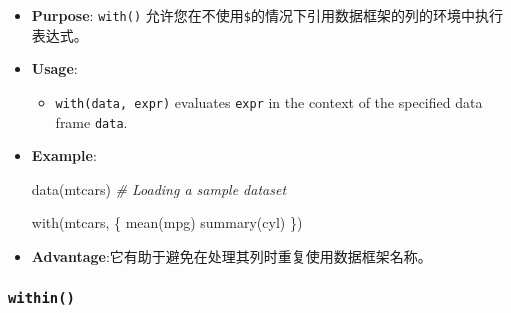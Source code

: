 \documentclass[
]{article}
\newenvironment{Shaded}{}{}
\newcommand{\CommentTok}[1]{\textcolor[rgb]{0.38,0.63,0.69}{\textit{#1}}}
\newcommand{\FunctionTok}[1]{\textcolor[rgb]{0.02,0.16,0.49}{#1}}
\newcommand{\NormalTok}[1]{#1}
\begin{document}
\begin{itemize}
\item
  \textbf{Purpose}: \texttt{with()}
  允许您在不使用\texttt{\$}的情况下引用数据框架的列的环境中执行表达式。
\item
  \textbf{Usage}:

  \begin{itemize}
  \item
    \texttt{with(data,\ expr)} evaluates \texttt{expr} in the context of
    the specified data frame \texttt{data}.
  \end{itemize}
\item
  \textbf{Example}:

\begin{Shaded}
\begin{Highlighting}[]
\FunctionTok{data}\NormalTok{(mtcars) }\CommentTok{\# Loading a sample dataset}

\FunctionTok{with}\NormalTok{(mtcars, \{}
  \FunctionTok{mean}\NormalTok{(mpg)}
  \FunctionTok{summary}\NormalTok{(cyl)}
\NormalTok{  \})}
\end{Highlighting}
\end{Shaded}
\item
  \textbf{Advantage}:它有助于避免在处理其列时重复使用数据框架名称。
\end{itemize}

\hypertarget{within}{%
\subsubsection{\texorpdfstring{\texttt{within()}}{within()}}\label{within}}
\end{document}
